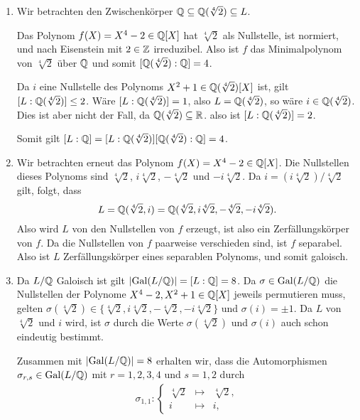 \begin{solution}
  \begin{enumerate}
    \item
      Wir betrachten den Zwischenkörper $\mathbb{Q} \subseteq \mathbb{Q}(\sqrt[4]{2}) \subseteq L$.
      
      Das Polynom $f(X) = X^4 - 2 \in \mathbb{Q}[X]$ hat $\sqrt[4]{2}$ als Nullstelle, ist normiert, und nach Eisenstein mit $2 \in \mathbb{Z}$ irreduzibel.
      Also ist $f$ das Minimalpolynom von $\sqrt[4]{2}$ über $\mathbb{Q}$ und somit $[\mathbb{Q}(\sqrt[4]{2}) : \mathbb{Q}] = 4$.
      
      Da $i$ eine Nullstelle des Polynoms $X^2 + 1 \in \mathbb{Q}(\sqrt[4]{2})[X]$ ist, gilt $[L : \mathbb{Q}(\sqrt[4]{2})] \leq 2$.
      Wäre $[L : \mathbb{Q}(\sqrt[4]{2})] = 1$, also $L = \mathbb{Q}(\sqrt[4]{2})$, so wäre $i \in \mathbb{Q}(\sqrt[4]{2})$.
      Dies ist aber nicht der Fall, da $\mathbb{Q}(\sqrt[4]{2}) \subseteq \mathbb{R}$.
      also ist $[L : \mathbb{Q}(\sqrt[4]{2})] = 2$.
      
      Somit gilt $[L : \mathbb{Q}] = [L : \mathbb{Q}(\sqrt[4]{2})] [\mathbb{Q}(\sqrt[4]{2}) : \mathbb{Q}] = 4$.
      
    \item
      Wir betrachten erneut das Polynom $f(X) = X^4 - 2 \in \mathbb{Q}[X]$.
      Die Nullstellen dieses Polynoms sind $\sqrt[4]{2}$, $i\sqrt[4]{2}$, $-\sqrt[4]{2}$ und $-i\sqrt[4]{2}$.
      Da $i = (i\sqrt[4]{2})/\sqrt[4]{2}$ gilt, folgt, dass
      \[
          L
        = \mathbb{Q}(\sqrt[4]{2}, i)
        = \mathbb{Q}(\sqrt[4]{2}, i\sqrt[4]{2}, -\sqrt[4]{2}, -i\sqrt[4]{2}).
      \]
      Also wird $L$ von den Nullstellen von $f$ erzeugt, ist also ein Zerfällungskörper von $f$.
      Da die Nullstellen von $f$ paarweise verschieden sind, ist $f$ separabel.
      Also ist $L$ Zerfällungskörper eines separablen Polynoms, und somit galoisch.
    
    \item
      Da $L/\mathbb{Q}$ Galoisch ist gilt $|{\operatorname{Gal}(L / \mathbb{Q})}| = [L : \mathbb{Q}] = 8$.
      Da $\sigma \in \operatorname{Gal}(L / \mathbb{Q})$ die Nullstellen der Polynome $X^4 - 2, X^2 + 1 \in \mathbb{Q}[X]$ jeweils permutieren muss, gelten $\sigma(\sqrt[4]{2}) \in \{ \sqrt[4]{2}, i\sqrt[4]{2}, -\sqrt[4]{2}, -i\sqrt[4]{2} \}$ und $\sigma(i) = \pm 1$.
      Da $L$ von $\sqrt[4]{2}$ und $i$ wird, ist $\sigma$ durch die Werte $\sigma(\sqrt[4]{2})$ und $\sigma(i)$ auch schon eindeutig bestimmt.
      
      Zusammen mit $|{\operatorname{Gal}(L / \mathbb{Q})}| = 8$ erhalten wir, dass die Automorphismen $\sigma_{r,s} \in \operatorname{Gal}(L / \mathbb{Q})$ mit $r = 1, 2, 3, 4$ und $s = 1, 2$ durch
      \begin{gather*}
        \sigma_{1,1} \colon
        \left\{
          \begin{array}{rcr}
            \sqrt[4]{2} & \mapsto & \sqrt[4]{2},  \\
            i           & \mapsto & i,
          \end{array}
        \right.
      \end{gather*}
  \end{enumerate}
\end{solution}


